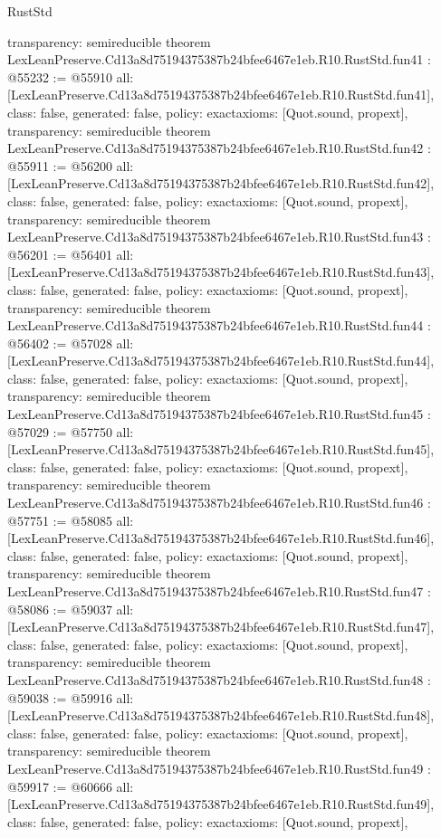 \begin{lexlean}{RustStd}
\begin{coremodule}
{  transparency: semireducible
}
theorem LexLeanPreserve.Cd13a8d75194375387b24bfee6467e1eb.R10.RustStd.fun41 : @55232 := @55910 {
  all: [LexLeanPreserve.Cd13a8d75194375387b24bfee6467e1eb.R10.RustStd.fun41],
  class: false,
  generated: false,
  policy: exact{axioms: [Quot.sound, propext]},
  transparency: semireducible
}
theorem LexLeanPreserve.Cd13a8d75194375387b24bfee6467e1eb.R10.RustStd.fun42 : @55911 := @56200 {
  all: [LexLeanPreserve.Cd13a8d75194375387b24bfee6467e1eb.R10.RustStd.fun42],
  class: false,
  generated: false,
  policy: exact{axioms: [Quot.sound, propext]},
  transparency: semireducible
}
theorem LexLeanPreserve.Cd13a8d75194375387b24bfee6467e1eb.R10.RustStd.fun43 : @56201 := @56401 {
  all: [LexLeanPreserve.Cd13a8d75194375387b24bfee6467e1eb.R10.RustStd.fun43],
  class: false,
  generated: false,
  policy: exact{axioms: [Quot.sound, propext]},
  transparency: semireducible
}
theorem LexLeanPreserve.Cd13a8d75194375387b24bfee6467e1eb.R10.RustStd.fun44 : @56402 := @57028 {
  all: [LexLeanPreserve.Cd13a8d75194375387b24bfee6467e1eb.R10.RustStd.fun44],
  class: false,
  generated: false,
  policy: exact{axioms: [Quot.sound, propext]},
  transparency: semireducible
}
theorem LexLeanPreserve.Cd13a8d75194375387b24bfee6467e1eb.R10.RustStd.fun45 : @57029 := @57750 {
  all: [LexLeanPreserve.Cd13a8d75194375387b24bfee6467e1eb.R10.RustStd.fun45],
  class: false,
  generated: false,
  policy: exact{axioms: [Quot.sound, propext]},
  transparency: semireducible
}
theorem LexLeanPreserve.Cd13a8d75194375387b24bfee6467e1eb.R10.RustStd.fun46 : @57751 := @58085 {
  all: [LexLeanPreserve.Cd13a8d75194375387b24bfee6467e1eb.R10.RustStd.fun46],
  class: false,
  generated: false,
  policy: exact{axioms: [Quot.sound, propext]},
  transparency: semireducible
}
theorem LexLeanPreserve.Cd13a8d75194375387b24bfee6467e1eb.R10.RustStd.fun47 : @58086 := @59037 {
  all: [LexLeanPreserve.Cd13a8d75194375387b24bfee6467e1eb.R10.RustStd.fun47],
  class: false,
  generated: false,
  policy: exact{axioms: [Quot.sound, propext]},
  transparency: semireducible
}
theorem LexLeanPreserve.Cd13a8d75194375387b24bfee6467e1eb.R10.RustStd.fun48 : @59038 := @59916 {
  all: [LexLeanPreserve.Cd13a8d75194375387b24bfee6467e1eb.R10.RustStd.fun48],
  class: false,
  generated: false,
  policy: exact{axioms: [Quot.sound, propext]},
  transparency: semireducible
}
theorem LexLeanPreserve.Cd13a8d75194375387b24bfee6467e1eb.R10.RustStd.fun49 : @59917 := @60666 {
  all: [LexLeanPreserve.Cd13a8d75194375387b24bfee6467e1eb.R10.RustStd.fun49],
  class: false,
  generated: false,
  policy: exact{axioms: [Quot.sound, propext]},
}
\end{coremodule}
\end{lexlean}
